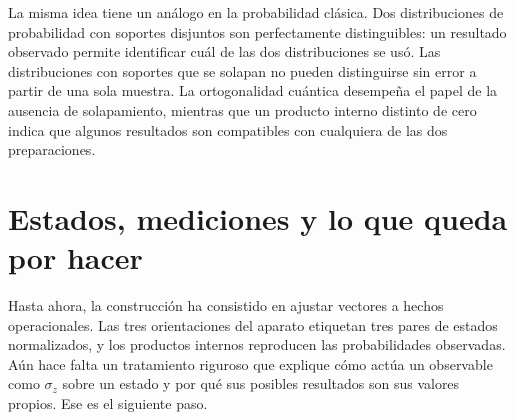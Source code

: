 \begin{classroomqa}
\end{classroomqa}

La misma idea tiene un análogo en la probabilidad clásica. Dos distribuciones de probabilidad con soportes disjuntos son perfectamente distinguibles: un resultado observado permite identificar cuál de las dos distribuciones se usó. Las distribuciones con soportes que se solapan no pueden distinguirse sin error a partir de una sola muestra. La ortogonalidad cuántica desempeña el papel de la ausencia de solapamiento, mientras que un producto interno distinto de cero indica que algunos resultados son compatibles con cualquiera de las dos preparaciones.

\begin{classroomqa}
\end{classroomqa}

\section{Estados, mediciones y lo que queda por hacer}

Hasta ahora, la construcción ha consistido en ajustar vectores a hechos operacionales. Las tres orientaciones del aparato etiquetan tres pares de estados normalizados, y los productos internos reproducen las probabilidades observadas. Aún hace falta un tratamiento riguroso que explique cómo actúa un observable como \(\sigma_z\) sobre un estado y por qué sus posibles resultados son sus valores propios. Ese es el siguiente paso.

